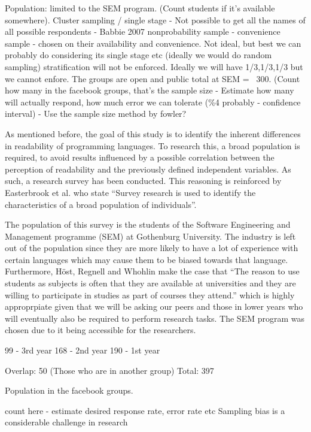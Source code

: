\documentclass[times, 10pt,twocolumn]{IEEEtran}
\begin{document}
  Population: limited to the SEM program. (Count students if it's available somewhere).
  Cluster sampling / single stage - Not possible to get all the names of all possible respondents - Babbie 2007
  nonprobability sample - convenience sample - chosen on their availability and convenience. Not ideal, but best we can probably do considering its single stage etc (ideally we would do random sampling)
  stratification will not be enforced. Ideally we will have 1/3,1/3,1/3 but we cannot enfore. The groups are open and public
  total at SEM = ~300. (Count how many in the facebook groups, that's the sample size - Estimate how many will actually respond, how much error we can tolerate (\%4 probably - confidence interval) - Use the sample size method by fowler?


As mentioned before, the goal of this study is to identify the inherent differences in readability of programming languages. To research this, a broad population is required, to avoid results influenced by a possible correlation between the perception of readability and the previously defined independent variables. As such, a research survey has been conducted. This reasoning is reinforced by Easterbrook et al. \cite{easterbrook2008selecting} who state ``Survey research is used to identify the characteristics of a broad population of individuals''. 
\newline

The population of this survey is the students of the Software Engineering and Management programme (SEM) at Gothenburg University. The industry is left out of the population since they are more likely to have a lot of experience with certain languages which may cause them to be biased towards that language. Furthermore, Höst, Regnell and Whohlin \cite{host2000using} make the case that ``The reason to use students as subjects is often that they are available at universities
and they are willing to participate in studies as part of courses they attend.'' which is highly approprpiate given that we will be asking our peers and those in lower years who will eventually also be required to perform research tasks. The SEM program was chosen due to it being accessible for the researchers. 

99 - 3rd year
168 - 2nd year
190 - 1st year

Overlap: 50 (Those who are in another group)
Total: 397

Population in the facebook groups.

count here - estimate desired response rate, error rate etc
Sampling bias is a considerable challenge in research \cite{easterbrook2008selecting}
\end{document}
